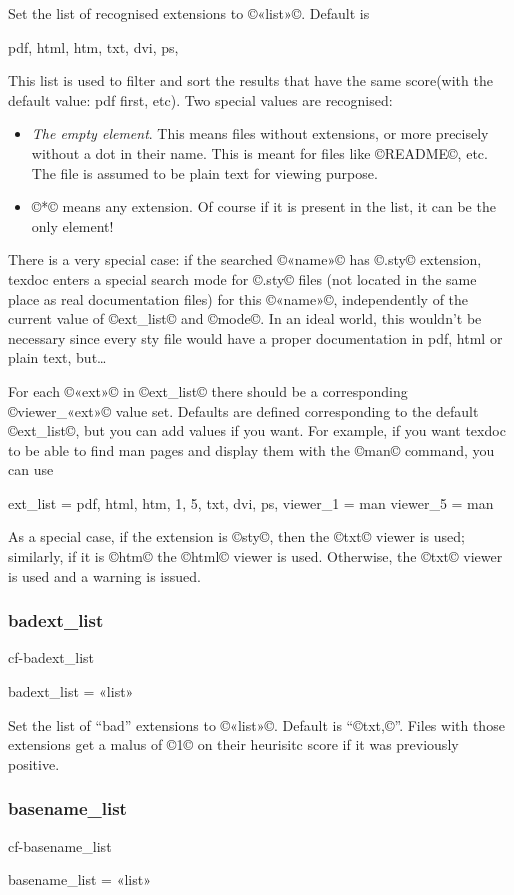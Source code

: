 \documentclass[a4paper, oneside]{scrartcl}
\makeatletter
\newif\ifframed
\newenvironment{cmdsubsub}[2]{%
  \framedfalse \commandes\subsubsection{#1}{#2}%
  }{%
  \endcommandes}
\newenvironment{htcode}{%
  \SaveVerbatim[samepage, gobble=2]{verbmat}%
  }{%
  \endSaveVerbatim
  \par\medskip\noindent\hspace*{\parindent}%
  \BUseVerbatim{verbmat}%
  \par\medskip\@endpetrue}
\makeatother
\begin{document}
Set the list of recognised extensions to ©«list»©.  Default is
\begin{htcode}
  pdf, html, htm, txt, dvi, ps,
\end{htcode}
This list is used to filter and  sort the results that have the same
score(with the default value: pdf first, etc).  Two special values are
recognised:
\begin{itemize}
  \item \emph{The empty element}. This means files without extensions, or more
    precisely without a dot in their name.  This is meant for files like
    ©README©, etc.  The file is assumed to be plain text for viewing purpose.
  \item ©*© means any extension.  Of course if it is present in the list, it
    can be the only element!
\end{itemize}

There is a very special case: if the searched ©«name»© has ©.sty© extension,
texdoc enters a special search mode for ©.sty© files (not located in the same
place as real documentation files) for this ©«name»©, independently of the
current value of ©ext_list© and ©mode©. In an ideal world, this wouldn't be
necessary since every sty file would have a proper documentation in pdf, html
or plain text, but\dots

For each ©«ext»© in ©ext_list© there should be a corresponding ©viewer_«ext»©
value set.  Defaults are defined corresponding to the default ©ext_list©, but
you can add values if you want.  For example, if you want texdoc to be able
to find man pages and display them with the ©man© command, you can use
\begin{htcode}
  ext_list = pdf, html, htm, 1, 5, txt, dvi, ps,
  viewer_1 = man
  viewer_5 = man
\end{htcode}

As a special case, if the extension is ©sty©, then the ©txt© viewer is used;
similarly, if it is ©htm© the ©html© viewer is used. Otherwise, the ©txt©
viewer is used and a warning is issued.

\begin{cmdsubsub}{badext_list}{cf-badext_list}
  badext_list = «list»
\end{cmdsubsub}

Set the list of ``bad'' extensions to ©«list»©.  Default is ``©txt,©''. Files
with those extensions get a malus of ©1© on their heurisitc score if it was
previously positive.

\begin{cmdsubsub}{basename_list}{cf-basename_list}
  basename_list = «list»
\end{cmdsubsub}
\end{document}
